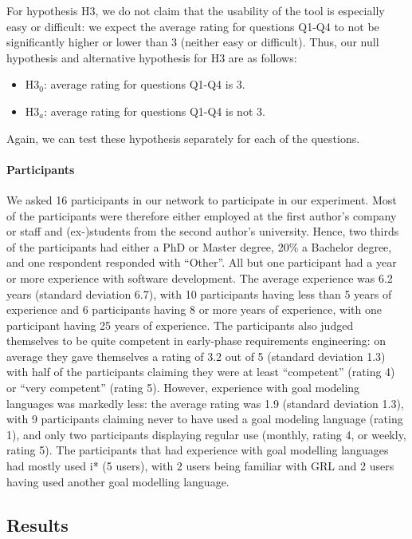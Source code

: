 For hypothesis H3, we do not claim that the usability of the tool is especially easy or difficult: we expect the average rating for questions Q1-Q4 to not be significantly higher or lower than 3 (neither easy or difficult). Thus, our null hypothesis and alternative hypothesis for H3 are as follows:  
\begin{itemize}
\item H3$_{0}$: average rating for questions Q1-Q4 is 3.
\item H3$_{a}$: average rating for questions Q1-Q4 is not 3.
\end{itemize}
Again, we can test these hypothesis separately for each of the questions.

\paragraph{Participants}
We asked 16 participants in our network to participate in our experiment. Most of the participants were therefore either employed at the first author's company or staff and (ex-)students from the second author's university. Hence, two thirds of the participants had either a PhD or Master degree, 20\% a Bachelor degree, and one respondent responded with ``Other''. All but one participant had a year or more experience with software development. The average experience was 6.2 years (standard deviation 6.7), with 10 participants having less than 5 years of experience and 6 participants having 8 or more years of experience, with one participant having 25 years of experience. The participants also judged themselves to be quite competent in  early-phase requirements engineering: on average they gave themselves a rating of 3.2 out of 5 (standard deviation 1.3) with half of the participants claiming they were at least ``competent'' (rating 4) or ``very competent'' (rating 5). However, experience with goal modeling languages was markedly less: the average rating was 1.9 (standard deviation 1.3), with 9 participants claiming never to have used a goal modeling language (rating 1), and only two participants displaying regular use (monthly, rating 4, or weekly, rating 5). The participants that had experience with goal modelling languages had mostly used i* (5 users), with 2 users being familiar with GRL and 2 users having used another goal modelling language.

\subsection{Results}\label{sec:survey:results}

